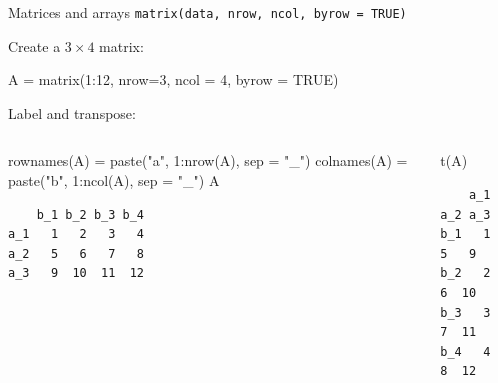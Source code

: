 \documentclass[
  ignorenonframetext,
]{beamer}
\newenvironment{Shaded}{\begin{snugshade}}{\end{snugshade}}
\newcommand{\AttributeTok}[1]{\textcolor[rgb]{0.00,0.34,0.68}{#1}}
\newcommand{\ConstantTok}[1]{\textcolor[rgb]{0.67,0.33,0.00}{#1}}
\newcommand{\DecValTok}[1]{\textcolor[rgb]{0.69,0.50,0.00}{#1}}
\newcommand{\FunctionTok}[1]{\textcolor[rgb]{0.39,0.29,0.61}{#1}}
\newcommand{\NormalTok}[1]{\textcolor[rgb]{0.12,0.11,0.11}{#1}}
\newcommand{\OtherTok}[1]{\textcolor[rgb]{0.00,0.43,0.16}{#1}}
\newcommand{\SpecialCharTok}[1]{\textcolor[rgb]{0.24,0.68,0.91}{#1}}
\newcommand{\StringTok}[1]{\textcolor[rgb]{0.75,0.01,0.01}{#1}}
\begin{document}
\begin{frame}[fragile]{Matrices and arrays}
\protect\hypertarget{matrices-and-arrays}{}
\texttt{matrix(data,\ nrow,\ ncol,\ byrow\ =\ TRUE)}

\pause

Create a \(3 \times 4\) matrix:

\begin{Shaded}
\begin{Highlighting}[]
\NormalTok{A }\OtherTok{=} \FunctionTok{matrix}\NormalTok{(}\DecValTok{1}\SpecialCharTok{:}\DecValTok{12}\NormalTok{, }\AttributeTok{nrow=}\DecValTok{3}\NormalTok{, }\AttributeTok{ncol =} \DecValTok{4}\NormalTok{, }\AttributeTok{byrow =} \ConstantTok{TRUE}\NormalTok{)}
\end{Highlighting}
\end{Shaded}

Label and transpose:

\begin{columns}[T]
\begin{column}{0.48\textwidth}
\scriptsize

\begin{Shaded}
\begin{Highlighting}[]
\FunctionTok{rownames}\NormalTok{(A) }\OtherTok{=} \FunctionTok{paste}\NormalTok{(}\StringTok{"a"}\NormalTok{, }\DecValTok{1}\SpecialCharTok{:}\FunctionTok{nrow}\NormalTok{(A), }\AttributeTok{sep =} \StringTok{"\_"}\NormalTok{)}
\FunctionTok{colnames}\NormalTok{(A) }\OtherTok{=} \FunctionTok{paste}\NormalTok{(}\StringTok{"b"}\NormalTok{, }\DecValTok{1}\SpecialCharTok{:}\FunctionTok{ncol}\NormalTok{(A), }\AttributeTok{sep =} \StringTok{"\_"}\NormalTok{)}
\NormalTok{A}
\end{Highlighting}
\end{Shaded}

\begin{verbatim}
    b_1 b_2 b_3 b_4
a_1   1   2   3   4
a_2   5   6   7   8
a_3   9  10  11  12
\end{verbatim}
\end{column}

\begin{column}{0.48\textwidth}
\scriptsize

\begin{Shaded}
\begin{Highlighting}[]
\FunctionTok{t}\NormalTok{(A)}
\end{Highlighting}
\end{Shaded}

\begin{verbatim}
    a_1 a_2 a_3
b_1   1   5   9
b_2   2   6  10
b_3   3   7  11
b_4   4   8  12
\end{verbatim}
\end{column}
\end{columns}
\end{frame}
\end{document}
